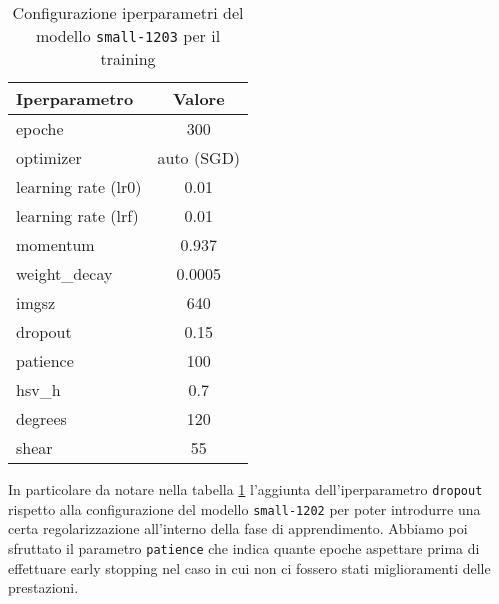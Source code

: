 \begin{table}[h!]
    \centering
    \begin{tabular}{lc}
        \hline
        \textbf{Iperparametro} & \textbf{Valore} \\
        \hline
        epoche & 300  \\
        optimizer & auto (SGD) \\
        learning rate (lr0) & 0.01 \\
        learning rate (lrf) & 0.01 \\
        momentum & 0.937 \\
        weight\_decay & 0.0005 \\
        imgsz & 640 \\
        dropout & 0.15 \\
        patience & 100 \\
        \midrule
        hsv\_h & 0.7 \\
        degrees & 120 \\
        shear & 55 \\
        \hline
    \end{tabular}
    \caption{Configurazione iperparametri del modello \texttt{small-1203} per il training}
    \label{tab:v2-model-configs}
    \end{table}

In particolare da notare nella tabella \ref*{tab:v2-model-configs} l'aggiunta dell'iperparametro \texttt{dropout} rispetto alla configurazione
del modello \texttt{small-1202} per poter introdurre una certa regolarizzazione all'interno della fase
di apprendimento. 
Abbiamo poi sfruttato il parametro \texttt{patience} che indica quante epoche aspettare
prima di effettuare early stopping nel caso in cui non ci fossero stati miglioramenti delle prestazioni.

